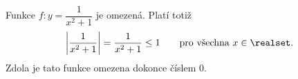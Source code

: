 \begin{mdframed}[style=mdexam]
  \begin{example}\label{mai:exam023}
    Funkce $f:y=\dfrac{1}{x^2+1}$ je omezená. Platí totiž 
    \begin{equation*}
      \left\lvert\frac{1}{x^2+1}\right\rvert=\frac{1}{x^2+1}\leq1 
      \qquad \text{pro všechna }x\in\realset.
    \end{equation*}
    Zdola je tato funkce omezena dokonce číslem $0$.  
  \end{example}
\end{mdframed}